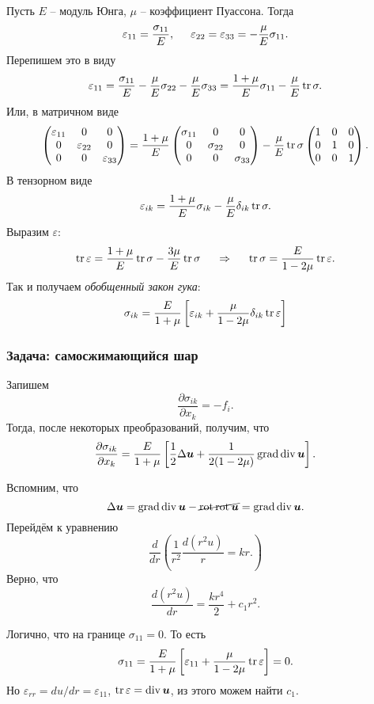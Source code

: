 Пусть $E$ -- модуль Юнга, $\mu$ -- коэффициент Пуассона. Тогда
$$
    \varepsilon_{11} = \frac{\sigma_{11}}{E}, \hspace{0.5cm} 
    \varepsilon_{22} = \varepsilon_{33} = - \frac{\mu}{E} \sigma_{11}.
$$
Перепишем это в виду
$$
    \varepsilon_{11} = \frac{\sigma_{11}}{E}  - \frac{\mu}{E} \sigma_{22} -
    \frac{\mu}{E} \sigma_{33} = \frac{1+\mu}{E} \sigma_{11} - \frac{\mu}{E} \mathop{\mathrm{tr}}\nolimits \sigma.
$$
Или, в матричном виде
$$
    \begin{pmatrix}
        \varepsilon_{11} & 0 & 0\\
        0 & \varepsilon_{22} & 0 \\
        0 & 0 & \varepsilon_{33}
    \end{pmatrix} =
    \frac{1+\mu}{E} 
    \begin{pmatrix}
        \sigma_{11} & 0 & 0\\
        0 & \sigma_{22} & 0 \\
        0 & 0 & \sigma_{33}
    \end{pmatrix} -
    \frac{\mu}{E} \mathop{\mathrm{tr}}\nolimits \sigma 
    \begin{pmatrix}
        1 & 0 & 0\\
        0 & 1 & 0 \\
        0 & 0 & 1
    \end{pmatrix}.
$$
В тензорном виде
$$
    \varepsilon_{ik} = \frac{1+\mu}{E} \sigma_{ik} - \frac{\mu}{E} \delta_{ik} \mathop{\mathrm{tr}}\nolimits \sigma .
$$
Выразим $\varepsilon$:
$$
    \mathop{\mathrm{tr}}\nolimits \varepsilon = \frac{1+\mu}{E} \mathop{\mathrm{tr}}\nolimits \sigma - \frac{3\mu}{E} \mathop{\mathrm{tr}}\nolimits \sigma
    \hspace{0.5cm} \Rightarrow \hspace{0.5cm} 
    \mathop{\mathrm{tr}}\nolimits \sigma = \frac{E}{1-2\mu} \mathop{\mathrm{tr}}\nolimits \varepsilon.
$$
Так и получаем \textit{обобщенный закон гука}:
\begin{equation}
    \sigma_{ik} = \frac{E}{1+\mu} \left[
        \varepsilon_{ik} + \frac{\mu}{1 - 2\mu} \delta_{ik} \mathop{\mathrm{tr}}\nolimits \varepsilon 
    \right]
\end{equation}

\subsubsection*{Задача: самосжимающийся шар}
Запишем
$$
    \frac{\partial \sigma_{ik}}{\partial x_k} = - f_i.
$$
Тогда, после некоторых преобразований, получим, что
$$
    \frac{\partial \sigma_{ik}}{\partial x_k} =
    \frac{E}{1+\mu}  \left[
        \frac{1}{2} \Delta \mbox{\boldmath $u$} + \frac{1}{2(1-2\mu)} \mathop{\mathrm{grad}}\nolimits \mathop{\mathrm{div}}\nolimits \mbox{\boldmath $u$}
    \right].
$$ 

Вспомним, что
$$
    \Delta \mbox{\boldmath $u$} = \mathop{\mathrm{grad}}\nolimits \mathop{\mathrm{div}}\nolimits \mbox{\boldmath $u$} - \cancel{\mathop{\mathrm{rot}}\nolimits \mathop{\mathrm{rot}}\nolimits \mbox{\boldmath $u$}} = \mathop{\mathrm{grad}}\nolimits \mathop{\mathrm{div}}\nolimits \mbox{\boldmath $u$}.
$$
Перейдём к уравнению
\begin{equation}
    \frac{d}{dr} \left(
        \frac{1}{r^2} \frac{d (r^2 u)}{r} = kr.
    \right)
\end{equation}
Верно, что
$$
    \frac{d (r^2 u)}{dr} = \frac{kr^4}{2} + c_1 r^2.
$$

Логично, что на границе $\sigma_{11} = 0$. То есть
$$
    \sigma_{11} = \frac{E}{1+\mu} \left[\varepsilon_{11} + \frac{\mu}{1-2\mu} \mathop{\mathrm{tr}}\nolimits \varepsilon \right] = 0.
$$
Но $\varepsilon_{rr} = du / dr = \varepsilon_{11}$, $\mathop{\mathrm{tr}}\nolimits \varepsilon = \mathop{\mathrm{div}}\nolimits \mbox{\boldmath $u$}$, из этого можем найти $c_1$.